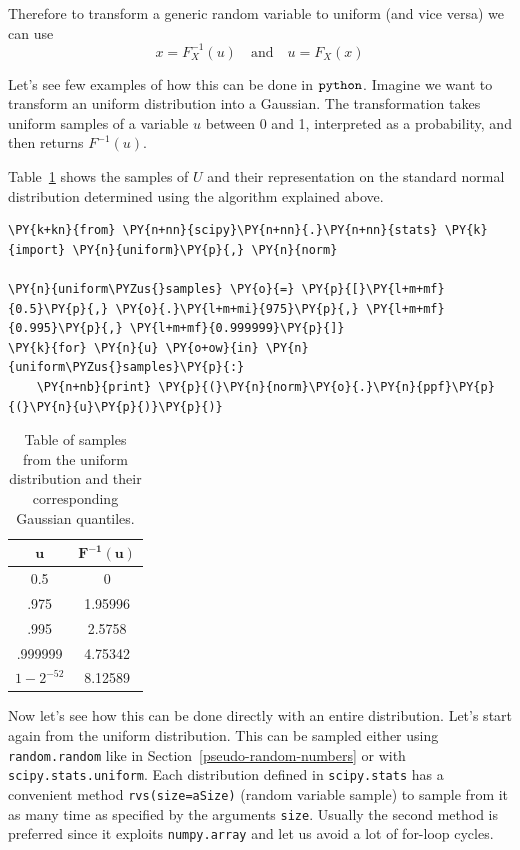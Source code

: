 Therefore to transform a generic random variable to uniform (and vice versa) we can use
\begin{equation}
x = F_{X}^{-1}(u)\quad\mathrm{and}\quad u = F_X(x)	
\end{equation} 

Let's see few examples of how this can be done in \(\tt{python}\).
Imagine we want to transform an uniform distribution into a Gaussian.
The transformation takes uniform samples of a variable \(u\) between 0 and
1, interpreted as a probability, and then returns $F^{-1}(u)$. 

Table~\ref{tab:transformation} shows the samples of $U$ and their representation on the standard normal
distribution determined using the algorithm explained above.

\begin{codebox}
\begin{Verbatim}[commandchars=\\\{\}]
\PY{k+kn}{from} \PY{n+nn}{scipy}\PY{n+nn}{.}\PY{n+nn}{stats} \PY{k}{import} \PY{n}{uniform}\PY{p}{,} \PY{n}{norm}
		
\PY{n}{uniform\PYZus{}samples} \PY{o}{=} \PY{p}{[}\PY{l+m+mf}{0.5}\PY{p}{,} \PY{o}{.}\PY{l+m+mi}{975}\PY{p}{,} \PY{l+m+mf}{0.995}\PY{p}{,} \PY{l+m+mf}{0.999999}\PY{p}{]}
\PY{k}{for} \PY{n}{u} \PY{o+ow}{in} \PY{n}{uniform\PYZus{}samples}\PY{p}{:}
    \PY{n+nb}{print} \PY{p}{(}\PY{n}{norm}\PY{o}{.}\PY{n}{ppf}\PY{p}{(}\PY{n}{u}\PY{p}{)}\PY{p}{)}
\end{Verbatim}
\end{codebox}

\begin{table}[h]
  \centering
  \begin{tabular}{|c|c|}
    \hline
    \(\mathbf{u}\) & \(\mathbf{F^{-1}(u)}\) \\
    \hline
    0.5 & 0 \\
    \hline
    .975 & 1.95996 \\
    \hline
    .995 & 2.5758 \\
    \hline
    .999999 & 4.75342 \\
    \hline
    \(1-2^{-52}\) & 8.12589 \\
    \hline
  \end{tabular}
  \caption{Table of samples from the uniform distribution and their corresponding Gaussian quantiles.}
\label{tab:transformation}
\end{table}

Now let's see how this can be done directly with an entire distribution. Let's start again from 
the uniform distribution. This can be sampled either using \texttt{random.random} 
like in Section~\ref{pseudo-random-numbers} or with \texttt{scipy.stats.uniform}. 
Each distribution defined in \texttt{scipy.stats} has a convenient method \texttt{rvs(size=aSize)} 
(random variable sample) to sample from it as many time as specified by the arguments \texttt{size}. 
Usually the second method is preferred since it exploits \texttt{numpy.array} and let us avoid a 
lot of for-loop cycles.

